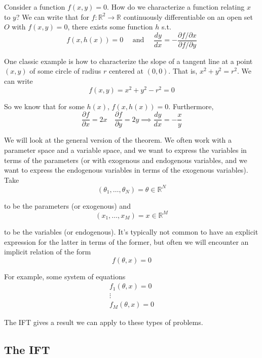 \documentclass{article}
\theoremstyle{mythm}
\theoremstyle{mydef}
\begin{document}
Consider a function $f(x, y) = 0$. How do we characterize a function relating $x$ to $y$? We can write that for $f: \mathbb{R}^2 \to \mathbb{R}$ continuously differentiable on an open set $O$ with $f(x, y) = 0$, there exists some function $h$ s.t.
\[
  f(x, h(x)) = 0
  \quad \text{ and } \quad 
  \dfrac{dy}{dx} = -\dfrac{\partial f / \partial x}{\partial f / \partial y}
\]

One classic example is how to characterize the slope of a tangent line at a point $(x, y)$ of some circle of radius $r$ centered at $(0, 0)$. That is, $x^2 + y^2 = r^2$. We can write
\[
  f(x, y) = x^2 + y^2 - r^2 = 0
\]

So we know that for some $h(x)$, $f(x, h(x)) = 0$. Furthermore,
\[
  \dfrac{\partial f}{\partial x}
  = 2x
  \quad
  \dfrac{\partial f}{\partial y}
  = 2y
  \implies
  \dfrac{dy}{dx}
  = - \dfrac{x}{y}
\]

We will look at the general version of the theorem. We often work with a parameter space and a variable space, and we  want to express the variables in terms of the parameters (or with exogenous and endogenous variables, and we want to express the endogenous variables in terms of the exogenous variables). Take
\[
  (\theta_1, \ldots, \theta_N) = \theta \in \mathbb{R}^N
\]

to be the parameters (or exogenous) and
\[
  (x_1, \ldots, x_M) = x \in \mathbb{R}^M
\]

to be the variables (or endogenous). It's typically not common to have an explicit expression for the latter in terms of the former, but often we will encounter an implicit relation of the form
\[
  f(\theta, x) = 0
\]

For example, some system of equations
\begin{equation}
  \begin{array}{c}
    f_1(\theta, x) = 0 \\
    \vdots \\
    f_M(\theta, x) = 0
  \end{array}
  \nonumber
\end{equation}

The IFT gives a result we can apply to these types of problems.

\subsection{The IFT}
\label{ssub:the_ift}
\end{document}
